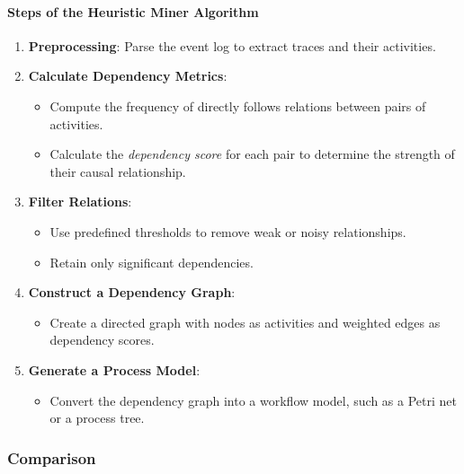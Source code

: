 \paragraph{Steps of the Heuristic Miner Algorithm}
\begin{enumerate}
    \item \textbf{Preprocessing}: Parse the event log to extract traces and their activities.
    \item \textbf{Calculate Dependency Metrics}:
    \begin{itemize}
        \item Compute the frequency of directly follows relations between pairs of activities.
        \item Calculate the \textit{dependency score} for each pair to determine the strength of their causal relationship.
    \end{itemize}
    \item \textbf{Filter Relations}:
    \begin{itemize}
        \item Use predefined thresholds to remove weak or noisy relationships.
        \item Retain only significant dependencies.
    \end{itemize}
    \item \textbf{Construct a Dependency Graph}:
    \begin{itemize}
        \item Create a directed graph with nodes as activities and weighted edges as dependency scores.
    \end{itemize}
    \item \textbf{Generate a Process Model}:
    \begin{itemize}
        \item Convert the dependency graph into a workflow model, such as a Petri net or a process tree.
    \end{itemize}
\end{enumerate}

\subsubsection{Comparison}

